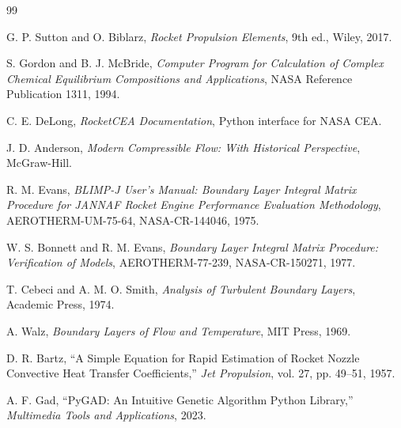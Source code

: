 \documentclass[11pt,a4paper]{article}
\begin{document}
\begin{thebibliography}{99}

G. P. Sutton and O. Biblarz, \textit{Rocket Propulsion Elements}, 9th ed., Wiley, 2017.

S. Gordon and B. J. McBride, \textit{Computer Program for Calculation of Complex Chemical Equilibrium Compositions and Applications}, NASA Reference Publication 1311, 1994.

C. E. DeLong, \textit{RocketCEA Documentation}, Python interface for NASA CEA.

J. D. Anderson, \textit{Modern Compressible Flow: With Historical Perspective}, McGraw-Hill.

R. M. Evans, \textit{BLIMP-J User's Manual: Boundary Layer Integral Matrix Procedure for JANNAF Rocket Engine Performance Evaluation Methodology}, AEROTHERM-UM-75-64, NASA-CR-144046, 1975.

W. S. Bonnett and R. M. Evans, \textit{Boundary Layer Integral Matrix Procedure: Verification of Models}, AEROTHERM-77-239, NASA-CR-150271, 1977.

T. Cebeci and A. M. O. Smith, \textit{Analysis of Turbulent Boundary Layers}, Academic Press, 1974.

A. Walz, \textit{Boundary Layers of Flow and Temperature}, MIT Press, 1969.

D. R. Bartz, ``A Simple Equation for Rapid Estimation of Rocket Nozzle Convective Heat Transfer Coefficients,'' \textit{Jet Propulsion}, vol. 27, pp. 49--51, 1957.

A. F. Gad, ``PyGAD: An Intuitive Genetic Algorithm Python Library,'' \textit{Multimedia Tools and Applications}, 2023.

\end{thebibliography}
\end{document}
